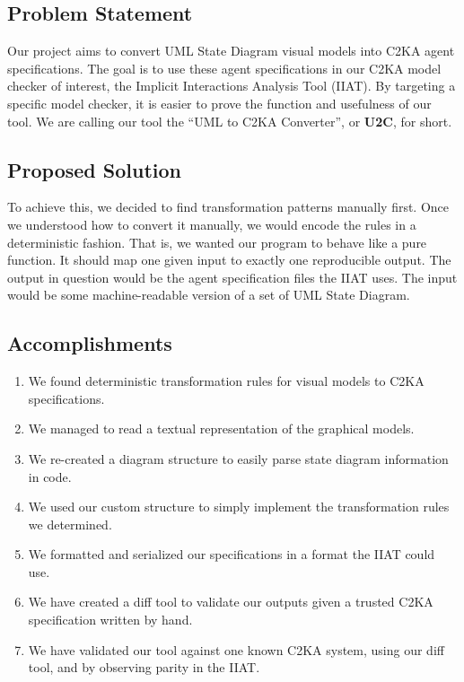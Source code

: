 \subsection{Problem Statement}\label{subsec:problem-statement}
Our project aims to convert UML State Diagram visual models into C2KA agent specifications.
The goal is to use these agent specifications in our C2KA model checker of interest, the Implicit Interactions Analysis Tool (IIAT).
By targeting a specific model checker, it is easier to prove the function and usefulness of our tool.
We are calling our tool the ``UML to C2KA Converter'', or \textbf{U2C}, for short.

\subsection{Proposed Solution}\label{subsec:proposed-solution}
To achieve this, we decided to find transformation patterns manually first.
Once we understood how to convert it manually, we would encode the rules in a deterministic fashion.
That is, we wanted our program to behave like a pure function.
It should map one given input to exactly one reproducible output.
The output in question would be the agent specification files the IIAT uses.
The input would be some machine-readable version of a set of UML State Diagram.

\subsection{Accomplishments}\label{subsec:accomplishments}
\begin{enumerate}
    \item We found deterministic transformation rules for visual models to C2KA specifications.
    \item We managed to read a textual representation of the graphical models.
    \item We re-created a diagram structure to easily parse state diagram information in code.
    \item We used our custom structure to simply implement the transformation rules we determined.
    \item We formatted and serialized our specifications in a format the IIAT could use.
    \item We have created a diff tool to validate our outputs given a trusted C2KA specification written by hand.
    \item We have validated our tool against one known C2KA system, using our diff tool, and by observing parity in the IIAT\@.
\end{enumerate}

